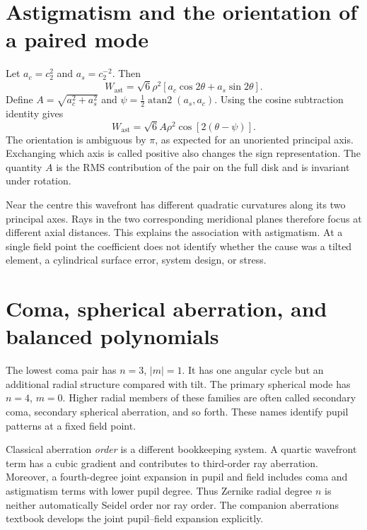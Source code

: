 \section{Astigmatism and the orientation of a paired mode}
Let $a_c=c_2^2$ and $a_s=c_2^{-2}$. Then
\begin{equation}
 W_{\mathrm{ast}}=\sqrt6\rho^2
                 [a_c\cos2\theta+a_s\sin2\theta].
\end{equation}
Define $A=\sqrt{a_c^2+a_s^2}$ and
$\psi=\tfrac12\operatorname{atan2}(a_s,a_c)$. Using the cosine
subtraction identity gives
\begin{equation}
 W_{\mathrm{ast}}=\sqrt6A\rho^2\cos[2(\theta-\psi)].
\end{equation}
The orientation is ambiguous by $\pi$, as expected for an unoriented
principal axis. Exchanging which axis is called positive also changes
the sign representation. The quantity $A$ is the RMS contribution of
the pair on the full disk and is invariant under rotation.

Near the centre this wavefront has different quadratic curvatures along
its two principal axes. Rays in the two corresponding meridional planes
therefore focus at different axial distances. This explains the
association with astigmatism. At a single field point the coefficient
does not identify whether the cause was a tilted element, a cylindrical
surface error, system design, or stress.

\section{Coma, spherical aberration, and balanced polynomials}
The lowest coma pair has $n=3$, $|m|=1$. It has one angular cycle but
an additional radial structure compared with tilt. The primary spherical
mode has $n=4$, $m=0$. Higher radial members of these families are often
called secondary coma, secondary spherical aberration, and so forth.
These names identify pupil patterns at a fixed field point.

Classical aberration \emph{order} is a different bookkeeping system.
A quartic wavefront term has a cubic gradient and contributes to
third-order ray aberration. Moreover, a fourth-degree joint expansion
in pupil and field includes coma and astigmatism terms with lower
pupil degree. Thus Zernike radial degree $n$ is neither automatically
Seidel order nor ray order. The companion aberrations textbook develops
the joint pupil--field expansion explicitly.

